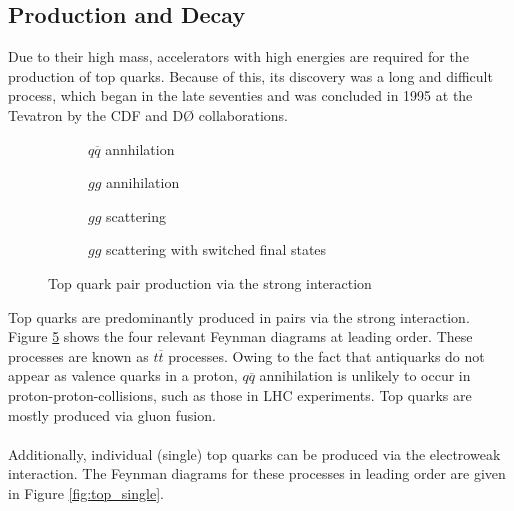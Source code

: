 \subsection{Production and Decay}
Due to their high mass, accelerators with high energies are required for the production of top quarks. Because of this, its discovery was a long and difficult process, which began in the late seventies \cite{RevModPhys.69.137} and was concluded in 1995 at the Tevatron by the CDF and D\O{} collaborations.
\begin{figure}[H]
    \centering
    \begin{subfigure}[t]{0.2\textwidth}
        \centering
        
        \caption{$q\overline{q}$ annhilation}
        \label{fig:top_pair_qqbar}
    \end{subfigure}\hfill
    \begin{subfigure}[t]{0.2\textwidth}
        \centering
        
        \caption{$gg$ annihilation}
        \label{fig:top_pair_gg}
    \end{subfigure}\hfill
    \begin{subfigure}[t]{0.2\textwidth}
        \centering
        
        \caption{$gg$ scattering}
        \label{fig:top_pair_gg_scatter}
    \end{subfigure}\hfill
    \begin{subfigure}[t]{0.2\textwidth}
        \centering
        
        \caption{$gg$ scattering with switched final states}
        \label{fig:top_pair_gg_scatter_switched}
    \end{subfigure}
    \caption{Top quark pair production via the strong interaction}
    \label{fig:top_pair}
\end{figure}
Top quarks are predominantly produced in pairs via the strong interaction. Figure \ref{fig:top_pair} shows the four relevant Feynman diagrams at leading order. These processes are known as $t\overline{t}$ processes. Owing to the fact that antiquarks do not appear as valence quarks in a proton, $q\overline{q}$ annihilation is unlikely to occur in proton-proton-collisions, such as those in LHC experiments. Top quarks are mostly produced via gluon fusion.\\ \\
Additionally, individual (single) top quarks can be produced via the electroweak interaction. The Feynman diagrams for these processes in leading order are given in Figure \ref{fig:top_single}.
